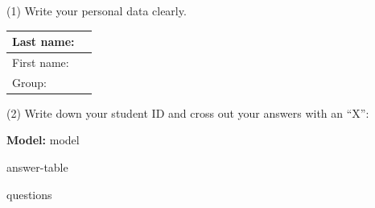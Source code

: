 \documentclass[a4paper,11pt]{article}
\begin{document}
\vspace{0.2cm}

\begin{center}
(1) Write your personal data clearly.
\end{center}

\begin{center}
\large

\begin{tabular}{|l|p{12cm}|}
\hline
Last name:   &  \\
\hline
First name: &    \\
\hline
Group:   &  \\
\hline
\end{tabular}
\end{center}

\vspace{0.2cm}

\begin{center}
(2) Write down your student ID and cross out your answers with an ``X'':
\end{center}

\begin{center}
\large
\textbf{Model:} {{model}}
\end{center}

{{answer-table}}

\clearpage

{{questions}}
\end{document}
